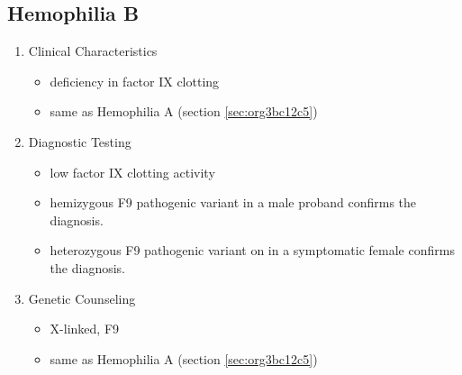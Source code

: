 \documentclass[12pt]{scrartcl}
\begin{document}
\subsection{Hemophilia B}
\label{sec:org024ff52}
\begin{enumerate}
\item Clinical Characteristics
\label{sec:orgb669602}
\begin{itemize}
\item deficiency in factor IX clotting
\item same as Hemophilia A (section \ref{sec:org3bc12c5})
\end{itemize}
\item Diagnostic Testing
\label{sec:orga393cc7}
\begin{itemize}
\item low factor IX clotting activity
\item hemizygous F9 pathogenic variant in a male proband confirms the
diagnosis.
\item heterozygous F9 pathogenic variant on in a symptomatic female
confirms the diagnosis.
\end{itemize}
\item Genetic Counseling
\label{sec:org7433e6b}
\begin{itemize}
\item X-linked, F9
\item same as Hemophilia A (section \ref{sec:org3bc12c5})
\end{itemize}
\end{enumerate}
\end{document}
